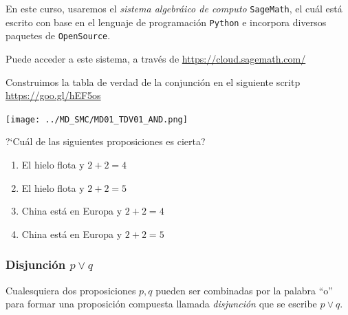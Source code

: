\documentclass[xcolor={svgnames},
  hyperref={colorlinks}, 
  spanish, 12pt]{beamer}
\numberwithin{equation}{section} %
\numberwithin{figure}{section} %
\begin{document}
\begin{frame}
    En este curso, usaremos el \emph{sistema algebr\'aico de computo} \texttt{SageMath}, el cu\'al est\'a escrito con base en el lenguaje de programaci\'on \texttt{Python} e incorpora diversos paquetes de \texttt{OpenSource}.
    \pause
    
    Puede acceder a este sistema, a trav\'es de \href{https://cloud.sagemath.com/}{https://cloud.sagemath.com/} 
    
\end{frame}

\begin{frame}
    Construimos la tabla de verdad de la conjunci\'on en el siguiente scritp \href{https://cloud.sagemath.com/projects/12787063-cafe-4f3b-a2e0-905f8b83cf3b/files/MD01_TRDV01_AND.sagews}{https://goo.gl/hEF5os}
    \begin{center}
        \texttt{[image: ../MD\_SMC/MD01\_TDV01\_AND.png]}
    \end{center}
    
\end{frame}

\begin{frame}
    \begin{exmp}
        ?`Cu\'al de las siguientes proposiciones es cierta?
        
        \begin{enumerate}
            \item El hielo flota y $2+2=4$
            \item El hielo flota y $2+2=5$
            \item China est\'a en Europa y $2+2=4$
            \item China est\'a en Europa y $2+2=5$
        \end{enumerate}
        
    \end{exmp}
    
\end{frame}

\subsubsection{Disjunci\'on $p \vee q$}

\begin{frame}
    Cualesquiera dos proposiciones $p,q$ pueden ser combinadas por la palabra ``o'' para formar una proposici\'on compuesta llamada \emph{disjunci\'on} que se escribe $p \vee q .$
\end{frame}
\end{document}
